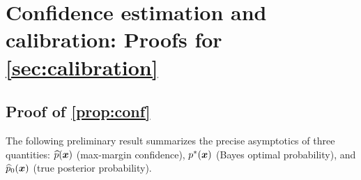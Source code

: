 \section{Confidence estimation and calibration: Proofs for \cref{sec:calibration}}
\label{append_sec:calib}

\subsection{Proof of \cref{prop:conf}}

The following preliminary result summarizes the precise asymptotics of three quantities: $\widehat p(\text{\boldmath $x$})$ (max-margin confidence), $p^*(\text{\boldmath $x$})$ (Bayes optimal probability), and $\widehat p_0(\text{\boldmath $x$})$ (true posterior probability).

